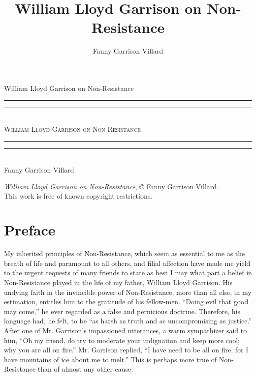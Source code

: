 \documentclass{book}
\date{}
\title{William Lloyd Garrison on Non-Resistance}
\author{Fanny Garrison Villard}
\begin{document}
\thispagestyle{empty}
\begin{center}
	{\Huge William Lloyd Garrison on Non-Resistance   \\[5mm]}
\end{center}
\newpage
\thispagestyle{empty}
\cleardoublepage
\begin{center}
	\thispagestyle{empty}
	\vspace*{\baselineskip}
	\rule{\textwidth}{1.6pt}\vspace*{-\baselineskip}\vspace*{2pt}
	\rule{\textwidth}{0.4pt}\\[\baselineskip]
	{\Huge\scshape William Lloyd Garrison on Non-Resistance   \\[5mm]}
	{\Large }
	\rule{\textwidth}{0.4pt}\vspace*{-\baselineskip}\vspace{3.2pt}
	\rule{\textwidth}{1.6pt}\\[\baselineskip]
	\vspace*{4\baselineskip}
	{\Large Fanny Garrison Villard}
	\vfill
\end{center}
\pagebreak
\newpage
\thispagestyle{empty}
\null\vfill
\noindent
\begin{center}
	{\emph{William Lloyd Garrison on Non-Resistance}, © Fanny Garrison Villard.\\[5mm]}
	{This work is free of known copyright restrictions.\\[5mm]}
\end{center}
\pagebreak
\newpage
\setcounter{tocdepth}{0}
\setcounter{secnumdepth}{0}

\chapter{Preface}
\label{chapter-0}
My inherited principles of Non-Resistance, which seem as essential to me as the breath of life and paramount to all others, and filial affection have made me yield to the urgent requests of many friends to state as best I may what part a belief in Non-Resistance played in the life of my father, William Lloyd Garrison. His undying faith in the invincible power of Non-Resistance, more than all else, in my estimation, entitles him to the gratitude of his fellow-men. “Doing evil that good may come,” he ever regarded as a false and pernicious doctrine. Therefore, his language had, he felt, to be “as harsh as truth and as uncompromising as justice.” After one of Mr. Garrison’s impassioned utterances, a warm sympathizer said to him, “Oh my friend, do try to moderate your indignation and keep more cool; why you are all on fire.” Mr. Garrison replied, “I have need to be all on fire, for I have mountains of ice about me to melt.” This is perhaps more true of Non-Resistance than of almost any other cause.
\end{document}
